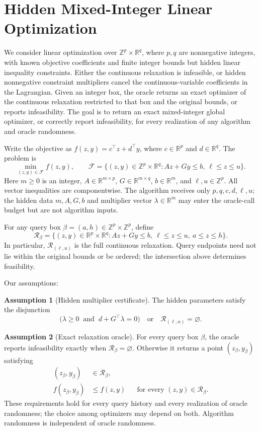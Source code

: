 \documentclass[10pt]{article}
\theoremstyle{definition}
\newtheorem{assumption}{Assumption}
\begin{document}
\section*{Hidden Mixed-Integer Linear Optimization}
We consider linear optimization over $\mathbb{Z}^p\times\mathbb{R}^q$, where $p,q$ are nonnegative integers, with known objective coefficients and finite integer bounds but hidden linear inequality constraints. Either the continuous relaxation is infeasible, or hidden nonnegative constraint multipliers cancel the continuous-variable coefficients in the Lagrangian. Given an integer box, the oracle returns an exact optimizer of the continuous relaxation restricted to that box and the original bounds, or reports infeasibility. The goal is to return an exact mixed-integer global optimizer, or correctly report infeasibility, for every realization of any algorithm and oracle randomness.

Write the objective as $f(z,y)=c^\top z+d^\top y$, where $c\in\mathbb{R}^p$ and $d\in\mathbb{R}^q$. The problem is
\[
\min_{(z,y)\in\mathcal{F}} f(z,y),
\qquad
\mathcal{F}=\bigl\{(z,y)\in\mathbb{Z}^p\times\mathbb{R}^q:
Az+Gy\leq b,\ \ell\leq z\leq u\bigr\}.
\]
Here $m\geq0$ is an integer, $A\in\mathbb{R}^{m\times p}$, $G\in\mathbb{R}^{m\times q}$, $b\in\mathbb{R}^m$, and $\ell,u\in\mathbb{Z}^p$. All vector inequalities are componentwise. The algorithm receives only $p,q,c,d,\ell,u$; the hidden data $m,A,G,b$ and multiplier vector $\lambda\in\mathbb{R}^m$ may enter the oracle-call budget but are not algorithm inputs.

For any query box $\beta=(a,h)\in\mathbb{Z}^p\times\mathbb{Z}^p$, define
\[
\mathcal{R}_{\beta}
=\bigl\{(z,y)\in\mathbb{R}^p\times\mathbb{R}^q:
Az+Gy\leq b,\ \ell\leq z\leq u,\ a\leq z\leq h\bigr\}.
\]
In particular, $\mathcal{R}_{(\ell,u)}$ is the full continuous relaxation. Query endpoints need not lie within the original bounds or be ordered; the intersection above determines feasibility.

Our assumptions:
\begin{assumption}[Hidden multiplier certificate]
The hidden parameters satisfy the disjunction
\[
\bigl(\lambda\geq0\ \text{ and }\ d+G^\top\lambda=0\bigr)
\quad\text{or}\quad
\mathcal{R}_{(\ell,u)}=\varnothing.
\]
\end{assumption}

\begin{assumption}[Exact relaxation oracle]
For every query box $\beta$, the oracle reports infeasibility exactly when $\mathcal{R}_{\beta}=\varnothing$. Otherwise it returns a point $(z_{\beta},y_{\beta})$ satisfying
\[
\begin{aligned}
(z_{\beta},y_{\beta})&\in\mathcal{R}_{\beta},\\
f(z_{\beta},y_{\beta})&\leq f(z,y)
&&\text{for every }(z,y)\in\mathcal{R}_{\beta}.
\end{aligned}
\]
These requirements hold for every query history and every realization of oracle randomness; the choice among optimizers may depend on both. Algorithm randomness is independent of oracle randomness.
\end{assumption}
\end{document}

